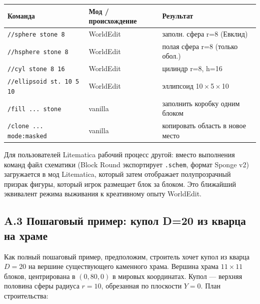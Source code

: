 \documentclass[12pt,a4paper]{scrartcl}
\newcommand{\code}[1]{\texttt{\small #1}}
\newcommand{\cmd}[1]{\textcolor{earth}{\texttt{\small #1}}}
\begin{document}
\vspace{0.4em}
\begin{center}
\small
\begin{tabularx}{\textwidth}{@{}llX@{}}
\toprule
\textbf{Команда} & \textbf{Мод / происхождение} & \textbf{Результат} \\
\midrule
\cmd{//sphere stone 8}     & WorldEdit & заполн. сфера r=8 (Евклид)  \\
\cmd{//hsphere stone 8}    & WorldEdit & полая сфера r=8 (только обол.)  \\
\cmd{//cyl stone 8 16}     & WorldEdit & цилиндр r=8, h=16  \\
\cmd{//ellipsoid st. 10 5 10} & WorldEdit & эллипсоид 10\,$\times$\,5\,$\times$\,10  \\
\cmd{/fill ... stone}      & vanilla & заполнить коробку одним блоком  \\
\cmd{/clone ... mode:masked} & vanilla & копировать область в новое место  \\
\bottomrule
\end{tabularx}
\end{center}

Для пользователей Litematica рабочий процесс другой: вместо выполнения команд файл схематики (Block Round экспортирует \code{.schem}, формат Sponge v2) загружается в мод Litematica, который затем отображает полупрозрачный призрак фигуры, который игрок размещает блок за блоком. Это ближайший эквивалент режима выживания к креативному опыту WorldEdit.

\subsection*{A.3 Пошаговый пример: купол D=20 из кварца на храме}
Как полный пошаговый пример, предположим, строитель хочет купол из кварца $D=20$ на вершине существующего каменного храма. Вершина храма $11 \times 11$ блоков, центрирована в $(0,80,0)$ в мировых координатах. Купол — верхняя половина сферы радиуса $r=10$, обрезанная по плоскости $Y=0$. План строительства:
\end{document}
